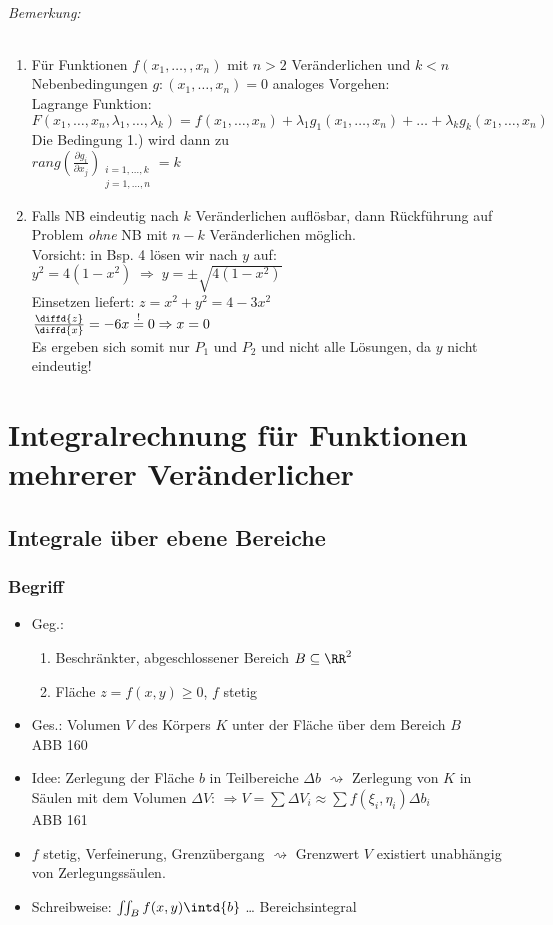 \subparagraph{Bemerkung:} 
\begin{enumerate}
\item Für Funktionen $f(x_1,\dots, ,x_n)$ mit $n>2$ Veränderlichen und $k<n$ Nebenbedingungen $g:(x_1, \dots, x_n)=0$ analoges Vorgehen:\\
Lagrange Funktion:\\
$F(x_1,\dots, x_n, \lambda_1, \dots, \lambda_k)=f(x_1,\dots, x_n)+\lambda_1g_1(x_1,\dots,x_n)+\dots+\lambda_kg_k(x_1,\dots,x_n)$\\
Die Bedingung 1.) wird dann zu \\
$rang\left(\frac{\partial g_i}{\partial x_j}\right)_{\substack{i=1,\dots,k\\j=1,\dots,n}}=k$
\item Falls NB eindeutig nach $k$ Veränderlichen auflösbar, dann Rückführung auf Problem \emph{ohne} NB mit $n-k$ Veränderlichen möglich.\\
Vorsicht: in Bsp. 4 lösen wir nach $y$ auf: $y^2=4(1-x^2) \; \Rightarrow \; y=\pm\sqrt{4(1-x^2)}$\\
Einsetzen liefert: $z=x^2+y^2=4-3x^2$\\
$\frac{\diffd{z}}{\diffd{x}}=-6x \overset{!}{=} 0 \Rightarrow x=0$\\
Es ergeben sich somit nur $P_1$ und $P_2$ und nicht alle Lösungen, da $y$ nicht eindeutig!
\end{enumerate}

\chapter{Integralrechnung für Funktionen mehrerer Veränderlicher}
\section{Integrale über ebene Bereiche}
\subsection{Begriff}
\begin{itemize}
\item Geg.: 
\begin{enumerate}
\item Beschränkter, abgeschlossener Bereich $B\subseteq \RR^2$
\item Fläche $z=f(x,y) \geq 0$, $f$ stetig
\end{enumerate}
\item Ges.: Volumen $V$ des Körpers $K$ unter der Fläche über dem Bereich $B$\\
ABB 160
\item Idee: Zerlegung der Fläche $b$ in Teilbereiche $\Delta b$ $\rightsquigarrow$ Zerlegung von $K$ in Säulen mit dem Volumen $\Delta V $: $\Rightarrow V = \sum \Delta V_i \approx \sum f(\xi_i, \eta_i)\Delta b_i$\\
ABB 161
\item $f$ stetig, Verfeinerung, Grenzübergang $\rightsquigarrow$ Grenzwert $V$ existiert unabhängig von Zerlegungssäulen.
\item Schreibweise: $\iint_B f(x,y)\intd{b}$ … Bereichsintegral
\end{itemize}

